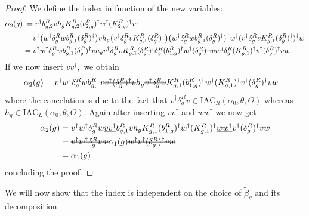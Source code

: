 \documentclass[12pt,a4paper,twoside]{article}
\newcommand{\stkout}[1]{\ifmmode\text{\sout{\ensuremath{#1}}}\else\sout{#1}\fi}
\newcommand{\defeq}{\vcentcolon=}
\let\originalleft\left
\let\originalright\right
\renewcommand{\left}{\mathopen{}\mathclose\bgroup\originalleft}
\renewcommand{\right}{\aftergroup\egroup\originalright}
\theoremstyle{definition}
\numberwithin{equation}{section}
\begin{document}
\begin{proof}
	We define the index in function of the new variables:
	\begin{align}
		\alpha_2(g)&\defeq v^\dagger b^R_{g,2}v h_g K^R_{g,2}(b^R_{2,g})^\dagger w^\dagger (K^R_{2,g})^\dagger w\\
		&=v^\dagger \left(w^\dagger\delta^R_g w b_{g,1}^R (\delta^R_g)^\dagger\right) v h_g \left(v^\dagger \delta_g^R v K_{g,1}^R (\delta_g^R)^\dagger\right) \left(w^\dagger\delta^R_g w b_{g,1}^R (\delta^R_g)^\dagger\right)^\dagger w^\dagger (v^\dagger \delta_g^R v K_{g,1}^R (\delta_g^R)^\dagger)^\dagger w\\
		&=v^\dagger w^\dagger\delta^R_g w b_{g,1}^R (\delta^R_g)^\dagger v h_g v^\dagger \delta_g^R v K_{g,1}^R \stkout{(\delta_g^R)^\dagger \delta_g^R} (b_{1,g}^R)^\dagger w^\dagger \stkout{(\delta_g^R)^\dagger w w^\dagger \delta_g^R} (K_{g,1}^R)^\dagger v^\dagger (\delta_g^R)^\dagger v  w.
	\end{align}
	If we now insert $vv^\dagger,$ we obtain
	\begin{align}
		\alpha_2(g)&=v^\dagger w^\dagger\delta^R_g w b_{g,1}^R v\stkout{v^\dagger (\delta^R_g)^\dagger v} h_g \stkout{v^\dagger \delta_g^R v} K_{g,1}^R (b_{1,g}^R)^\dagger w^\dagger (K_{g,1}^R)^\dagger v^\dagger (\delta_g^R)^\dagger v  w
	\end{align}
	where the cancelation is due to the fact that $v^\dagger \delta^R_g v\in\textrm{IAC}_{R}(\alpha_0,\theta,\Theta)$ whereas $h_g\in \textrm{IAC}_{L}(\alpha_0,\theta,\Theta)$. Again after inserting $vv^\dagger$ and $ww^\dagger$ we now get
	\begin{align}
		\alpha_2(g)&=v^\dagger w^\dagger\delta^R_g w \underline{v v^\dagger} b_{g,1}^R v h_g K_{g,1}^R (b_{1,g}^R)^\dagger w^\dagger (K_{g,1}^R)^\dagger \underline{ww^\dagger} v^\dagger (\delta_g^R)^\dagger v  w\\
		&=\stkout{v^\dagger w^\dagger\delta^R_g w v} \alpha_1(g) \stkout{w^\dagger v^\dagger (\delta_g^R)^\dagger v  w}\\
		&=\alpha_1(g)
	\end{align}
	concluding the proof.
\end{proof}
We will now show that the index is independent on the choice of $\tilde{\beta}_g$ and its decomposition.
\end{document}
